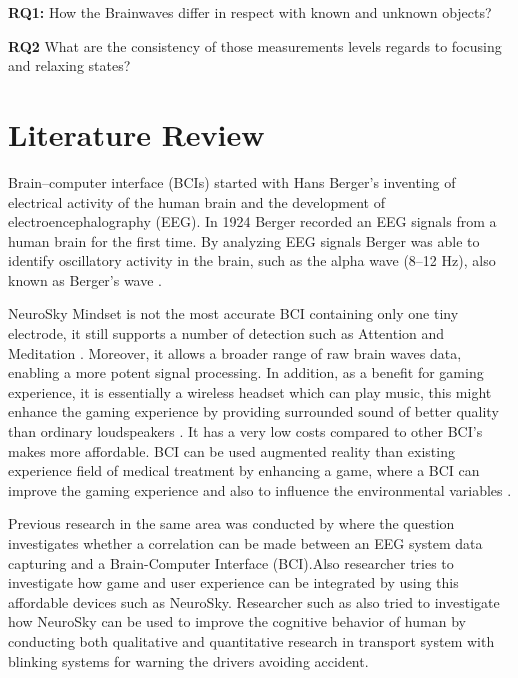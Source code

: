 \documentclass{bioinfo}
\begin{document}
\textbf{RQ1:} How the Brainwaves differ in respect with known and unknown objects?

\textbf{RQ2} What are the consistency of those measurements levels regards to focusing and relaxing states?

\section{Literature Review}

Brain–computer interface (BCIs) started with Hans Berger's inventing of electrical activity of the human brain and the development of electroencephalography (EEG). In 1924 Berger recorded an EEG signals from a human brain for the first time. By analyzing EEG signals Berger was able to identify oscillatory activity in the brain, such as the alpha wave (8–12 Hz), also known as Berger's wave \citep{cauvery}.

NeuroSky Mindset is not the most accurate BCI containing only one tiny electrode, it still supports a number of detection such as Attention and Meditation \citep{stonehill}. Moreover, it allows a broader range of raw brain waves data, enabling a more potent signal processing. In addition, as a benefit for gaming experience, it is essentially a wireless headset which can play music, this might enhance the gaming experience by providing surrounded sound of better quality than ordinary loudspeakers \citep{lyu}. It has a very low costs compared to other BCI's makes more affordable. BCI can be used augmented reality than existing experience field of medical treatment by enhancing a game, where a BCI can improve the gaming experience and also to influence the environmental variables \citep{Nacke}. 

Previous research in the same area was conducted by \citep{dietrich} where the question investigates whether a correlation can be made between an EEG system data capturing and a Brain-Computer Interface (BCI).Also researcher \citep{lyu} tries to investigate how game and user experience can be integrated by using this affordable devices such as NeuroSky. Researcher such as \citep{stonehill} also tried to investigate how NeuroSky can be used to improve the cognitive behavior of human by conducting both qualitative and quantitative research in transport system with blinking systems for warning the drivers avoiding accident.
\end{document}
